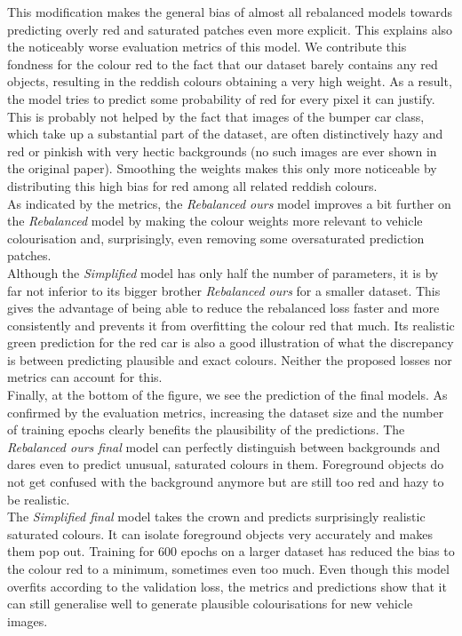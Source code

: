 \documentclass{article}
\begin{document}
This modification makes the general bias of almost all rebalanced models towards predicting
overly red and saturated patches even more explicit. This explains also the
noticeably worse evaluation metrics of this model.
We contribute this fondness for the colour red to the fact that our dataset barely contains any red objects,
resulting in the reddish colours obtaining a very high weight. As a result, the model tries to predict some probability of red for every pixel it can justify.
This is probably not helped by the fact that images of the
bumper car class, which take up a substantial part of the dataset, are often distinctively hazy and red or pinkish with
very hectic backgrounds (no such images are ever shown in the original paper).
Smoothing the weights makes this only more noticeable by distributing this high bias for red among
all related reddish colours.\\
As indicated by the metrics, the \textit{Rebalanced ours} model improves a bit further on the \textit{Rebalanced} model
by making the colour weights more relevant to vehicle colourisation and, surprisingly, even removing some
oversaturated prediction patches.\\
Although the \textit{Simplified} model has only half the number of parameters, it is by far not inferior to
its bigger brother \textit{Rebalanced ours} for a smaller dataset. This gives the advantage of being able to reduce the
rebalanced loss faster and more consistently and prevents it from overfitting the colour red that much.
Its realistic green prediction for the red car is also a good illustration of what the discrepancy is between
predicting plausible and exact colours. Neither the proposed losses nor metrics can account for this.\\
Finally, at the bottom of the figure, we see the prediction of the final models.
As confirmed by the evaluation metrics, increasing the dataset size and the number of training epochs clearly
benefits the plausibility of the predictions.
The \textit{Rebalanced ours final} model can perfectly distinguish between backgrounds and dares even to
predict unusual, saturated colours in them. Foreground objects do not get confused with the background anymore
but are still too red and hazy to be realistic.\\
The \textit{Simplified final} model takes the crown and predicts surprisingly realistic saturated colours.
It can isolate foreground objects very accurately and makes them pop out.
Training for 600 epochs on a larger dataset has reduced the bias to the colour red to a minimum, sometimes even too much.
Even though this model overfits according to the validation loss, the metrics and predictions show
that it can still generalise well to generate plausible colourisations for new vehicle images.
\end{document}
